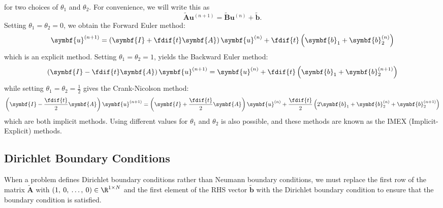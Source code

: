 \documentclass{article}
\begin{document}
for two choices of \(\theta_1\) and \(\theta_2\). For convenience, we will
write this as
\begin{equation*}
    \tilde{\symbf{A}} \symbf{u}^{\left( n+1 \right)} = \tilde{\symbf{B}} \symbf{u}^{\left( n \right)} + \tilde{\symbf{b}}.
\end{equation*}
Setting \(\theta_1 = \theta_2 = 0\), we obtain the Forward Euler method:
\begin{equation*}
    \symbf{u}^{\left( n+1 \right)} = \left( \symbf{I} + \fdif{t} \symbf{A} \right) \symbf{u}^{\left( n \right)} + \fdif{t} \left( \symbf{b}_1 + \symbf{b}_2^{\left( n \right)} \right)
\end{equation*}
which is an explicit method. Setting \(\theta_1 = \theta_2 = 1\), yields
the Backward Euler method:
\begin{equation*}
    \left( \symbf{I} - \fdif{t} \symbf{A} \right) \symbf{u}^{\left( n+1 \right)} = \symbf{u}^{\left( n \right)} + \fdif{t} \left( \symbf{b}_1 + \symbf{b}_2^{\left( n+1 \right)} \right)
\end{equation*}
while setting \(\theta_1 = \theta_2 = \frac{1}{2}\) gives the Crank-Nicolson
method:
\begin{equation*}
    \left( \symbf{I} - \frac{\fdif{t}}{2} \symbf{A} \right) \symbf{u}^{\left( n+1 \right)} = \left( \symbf{I} + \frac{\fdif{t}}{2} \symbf{A} \right) \symbf{u}^{\left( n \right)} + \frac{\fdif{t}}{2} \left( 2 \symbf{b}_1 + \symbf{b}_2^{\left( n \right)} + \symbf{b}_2^{\left( n+1 \right)} \right)
\end{equation*}
which are both implicit methods. Using different values for \(\theta_1\)
and \(\theta_2\) is also possible, and these methods are known as the
IMEX (Implicit-Explicit) methods.
\subsection{Dirichlet Boundary Conditions}
When a problem defines Dirichlet boundary conditions rather than
Neumann boundary conditions, we must replace the first row of the
matrix \(\tilde{\symbf{A}}\) with \({\left( 1,\: 0,\: \dots,\: 0
\right)} \in \R^{1 \times N}\) and the first element of the RHS vector
\(\tilde{\symbf{b}}\) with the Dirichlet boundary condition to ensure
that the boundary condition is satisfied.
\end{document}
